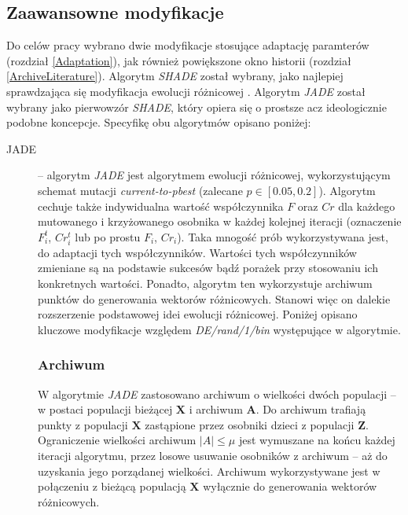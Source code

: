 \documentclass[12pt,a4paper]{report}
\begin{document}
{{{\subsection{Zaawansowne modyfikacje}
\par{
Do celów pracy wybrano dwie modyfikacje stosujące adaptację paramterów (rozdział \ref{Adaptation}), jak również powiększone okno historii (rozdział \ref{ArchiveLiterature}). Algorytm \emph{SHADE} \cite{SHADE} został wybrany, jako najlepiej sprawdzająca się modyfikacja ewolucji różnicowej \cite{CEC2013Comp}. Algorytm \emph{JADE} \cite{JADE} został wybrany jako pierwowzór \emph{SHADE}, który opiera się o prostsze acz ideologicznie podobne koncepcje. Specyfikę obu algorytmów opisano poniżej:
}
\begin{description}
\item[JADE] \cite{JADE} -- algorytm \emph{JADE} jest algorytmem ewolucji różnicowej, wykorzystującym schemat mutacji \emph{current-to-pbest} (zalecane $p \in [0.05, 0.2]$). Algorytm cechuje także indywidualna wartość współczynnika $F$ oraz $Cr$ dla każdego mutowanego i krzyżowanego osobnika w każdej kolejnej iteracji (oznaczenie $F_i^t$, $Cr_i^t$ lub po prostu $F_i$, $Cr_i$). Taka mnogość prób wykorzystywana jest, do adaptacji tych współczynników. Wartości tych współczynników zmieniane są na podstawie sukcesów bądź porażek przy stosowaniu ich konkretnych wartości. Ponadto, algorytm ten wykorzystuje archiwum punktów do generowania wektorów różnicowych. Stanowi więc on dalekie rozszerzenie podstawowej idei ewolucji różnicowej. Poniżej opisano kluczowe modyfikacje względem \emph{DE/rand/1/bin} występujące w algorytmie.
\subsubsection{Archiwum}
\par{
W algorytmie \emph{JADE} zastosowano archiwum o wielkości dwóch populacji -- w postaci populacji bieżącej $\mathbf{X}$ i archiwum $\mathbf{A}$. Do archiwum trafiają punkty z populacji $\mathbf{X}$ zastąpione przez osobniki dzieci z populacji $\mathbf{Z}$. Ograniczenie wielkości archiwum $|A| \le \mu$ jest wymuszane na końcu każdej iteracji algorytmu, przez losowe usuwanie osobników z archiwum -- aż do uzyskania jego porządanej wielkości. Archiwum wykorzystywane jest w połączeniu z bieżącą populacją $\mathbf{X}$ wyłącznie do generowania wektorów różnicowych.
}

\end{description}}}}
\end{document}
